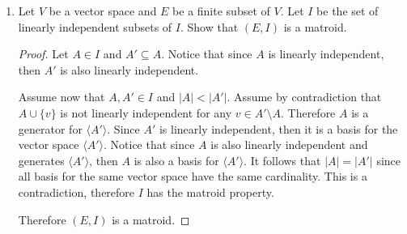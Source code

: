 \documentclass[12pt]{article}
\begin{document}
\begin{enumerate}
    \item Let $V$ be a vector space and $E$ be a finite subset of $V$. Let $I$ be the set of linearly independent subsets of $I$. Show that $(E,I)$ is a matroid.
    
    \begin{proof}
    Let $A \in I$ and $A' \subseteq A$. Notice that since $A$ is linearly independent, then $A'$ is also linearly independent.
    
    Assume now that $A, A' \in I$ and $\vert A \vert < \vert A' \vert$. Assume by contradiction that $A \cup \{v\}$ is not linearly independent for any $v \in A' \setminus A$. Therefore $A$ is a generator for $\langle A' \rangle$. Since $A'$ is linearly independent, then it is a basis for the vector space $\langle A' \rangle$. Notice that since $A$ is also linearly independent and generates $\langle A' \rangle$, then $A$ is also a basis for $\langle A' \rangle$. It follows that $\vert A \vert = \vert A' \vert$ since all basis for the same vector space have the same cardinality. This is a contradiction, therefore $I$ has the matroid property.
    
    Therefore $(E,I)$ is a matroid.
    \end{proof}
    

    
    
    \end{enumerate}
    

    
\end{document}
